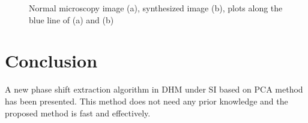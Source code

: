 \documentclass[letterpaper,10pt]{article}
\begin{document}
\begin{figure}[h]
    \centering
    \centering
    \caption{Normal microscopy image (a), synthesized image (b), plots along the blue line of (a) and (b)}
\end{figure}

\section{Conclusion}
A new phase shift extraction algorithm in DHM under SI based on PCA method has been presented.
This method does not need any prior knowledge and the proposed method is fast and effectively.
\end{document}
